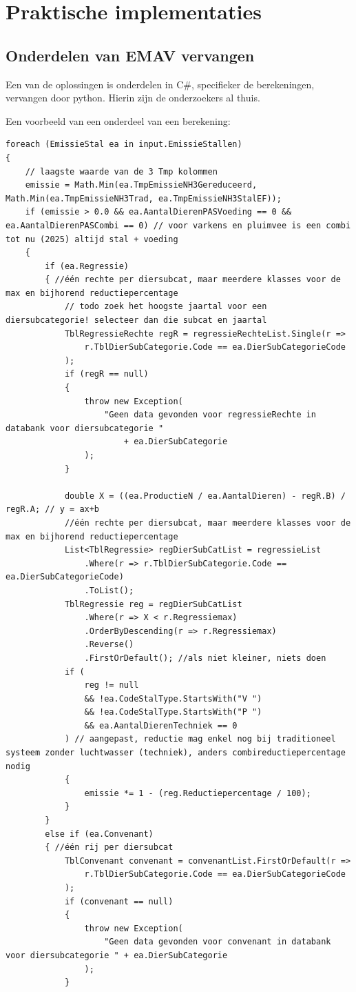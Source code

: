 \chapter{Praktische implementaties}
\label{ch:prak}

\section{Onderdelen van EMAV vervangen}
Een van de oplossingen is onderdelen in C\#, specifieker de berekeningen, vervangen door python.
Hierin zijn de onderzoekers al thuis.

Een voorbeeld van een onderdeel van een berekening:
\begin{verbatim}
foreach (EmissieStal ea in input.EmissieStallen)
{
    // laagste waarde van de 3 Tmp kolommen
    emissie = Math.Min(ea.TmpEmissieNH3Gereduceerd, Math.Min(ea.TmpEmissieNH3Trad, ea.TmpEmissieNH3StalEF));
    if (emissie > 0.0 && ea.AantalDierenPASVoeding == 0 && ea.AantalDierenPASCombi == 0) // voor varkens en pluimvee is een combi tot nu (2025) altijd stal + voeding
    {
        if (ea.Regressie)
        { //één rechte per diersubcat, maar meerdere klasses voor de max en bijhorend reductiepercentage
            // todo zoek het hoogste jaartal voor een diersubcategorie! selecteer dan die subcat en jaartal
            TblRegressieRechte regR = regressieRechteList.Single(r =>
                r.TblDierSubCategorie.Code == ea.DierSubCategorieCode
            );
            if (regR == null)
            {
                throw new Exception(
                    "Geen data gevonden voor regressieRechte in databank voor diersubcategorie "
                        + ea.DierSubCategorie
                );
            }

            double X = ((ea.ProductieN / ea.AantalDieren) - regR.B) / regR.A; // y = ax+b
            //één rechte per diersubcat, maar meerdere klasses voor de max en bijhorend reductiepercentage
            List<TblRegressie> regDierSubCatList = regressieList
                .Where(r => r.TblDierSubCategorie.Code == ea.DierSubCategorieCode)
                .ToList();
            TblRegressie reg = regDierSubCatList
                .Where(r => X < r.Regressiemax)
                .OrderByDescending(r => r.Regressiemax)
                .Reverse()
                .FirstOrDefault(); //als niet kleiner, niets doen
            if (
                reg != null
                && !ea.CodeStalType.StartsWith("V ")
                && !ea.CodeStalType.StartsWith("P ")
                && ea.AantalDierenTechniek == 0
            ) // aangepast, reductie mag enkel nog bij traditioneel systeem zonder luchtwasser (techniek), anders combireductiepercentage nodig
            {
                emissie *= 1 - (reg.Reductiepercentage / 100);
            }
        }
        else if (ea.Convenant)
        { //één rij per diersubcat
            TblConvenant convenant = convenantList.FirstOrDefault(r =>
                r.TblDierSubCategorie.Code == ea.DierSubCategorieCode
            );
            if (convenant == null)
            {
                throw new Exception(
                    "Geen data gevonden voor convenant in databank voor diersubcategorie " + ea.DierSubCategorie
                );
            }


\end{verbatim}

